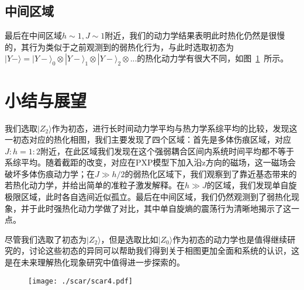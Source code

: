 

\subsection{中间区域}
最后在中间区域$h\sim 1, J \sim 1$附近，我们的动力学结果表明此时热化仍然是很慢的，其行为类似于之前观测到的弱热化行为，与此时选取初态为$|Y-\rangle = |Y-\rangle_0 \otimes|Y-\rangle_1\otimes |Y-\rangle_2 \otimes... $的热化动力学有很大不同，如图~\ref{midweak}~所示。


\section{小结与展望}
我们选取$|Z_2\rangle$作为初态，进行长时间动力学平均与热力学系综平均的比较，发现这一初态对应的热化相图，我们主要发现了四个区域：首先是多体伤痕区域，对应$J:h=1:2$附近，在此区域我们发现在这个强弱耦合区间内系统时间平均都不等于系综平均。随着截距的改变，对应在PXP模型下加入沿z方向的磁场，这一磁场会破坏多体伤痕动力学；在$J\gg h/2$的弱热化区域下，我们观察到了靠近基态带来的若热化动力学，并给出简单的准粒子激发解释。在$h\gg J$的区域，我们发现单自旋极限区域，此时各自选间近似孤立。最后在中间区域，我们仍然观测到了弱热化现象，并于此时强热化动力学做了对比，其中单自旋熵的震荡行为清晰地揭示了这一点。

尽管我们选取了初态为$|Z_2\rangle$，但是选取比如$|Z_0\rangle$作为初态的动力学也是值得继续研究的，讨论这些初态的异同可以帮助我们得到关于相图更加全面和系统的认识，这是在未来理解热化现象研究中值得进一步探索的。



\begin{figure}[h]
\centering
\texttt{[image: ./scar/scar4.pdf]}
\label{midweak}
\end{figure}









